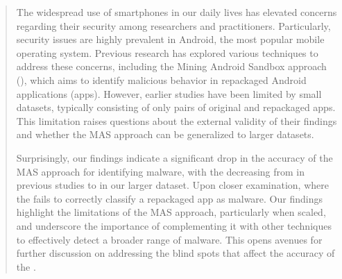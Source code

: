 \begin{abstract}


The widespread use of smartphones in our daily lives has elevated concerns regarding their security among researchers and practitioners.
Particularly, security issues are highly prevalent in Android, the most popular mobile operating system. Previous research has explored
various techniques to address these concerns, including the Mining Android Sandbox approach (\mas), which aims to identify malicious behavior in repackaged Android applications (apps).
However, earlier studies have been limited by small datasets, typically consisting of only \appsSmall pairs of original and repackaged apps.
This limitation raises questions about the external validity of their findings and whether the MAS approach can be generalized to larger datasets.

 Surprisingly, our findings indicate a significant drop in the accuracy of the MAS approach for identifying malware, with
the \fone decreasing from \fscoreSmall in previous studies to \fscore in our larger dataset. Upon closer examination,  where the \mas fails to correctly classify a repackaged app as malware. Our findings highlight the limitations of the MAS approach, particularly when scaled, and underscore the importance of complementing it with other techniques to effectively detect a
broader range of malware. This opens avenues for further discussion on addressing the blind spots
that affect the accuracy of the \mas.



\end{abstract}